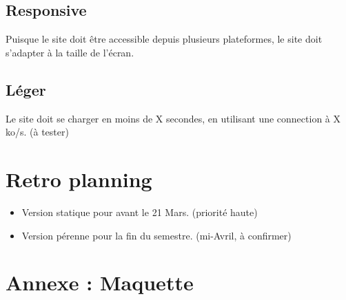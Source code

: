 \documentclass[11pt]{report}
\begin{document}
\subsection*{Responsive}
Puisque le site doit être accessible depuis plusieurs plateformes, le site doit s'adapter à la taille de l'écran.

\subsection*{Léger}
Le site doit se charger en moins de X secondes, en utilisant une connection à
X ko/s. (à tester)


\section{Retro planning}

\begin{itemize}
	\item Version statique pour avant le 21 Mars. (priorité haute)
	\item Version pérenne pour la fin du semestre. (mi-Avril, à confirmer)
\end{itemize}


\newpage

\section{Annexe : Maquette}
\end{document}
